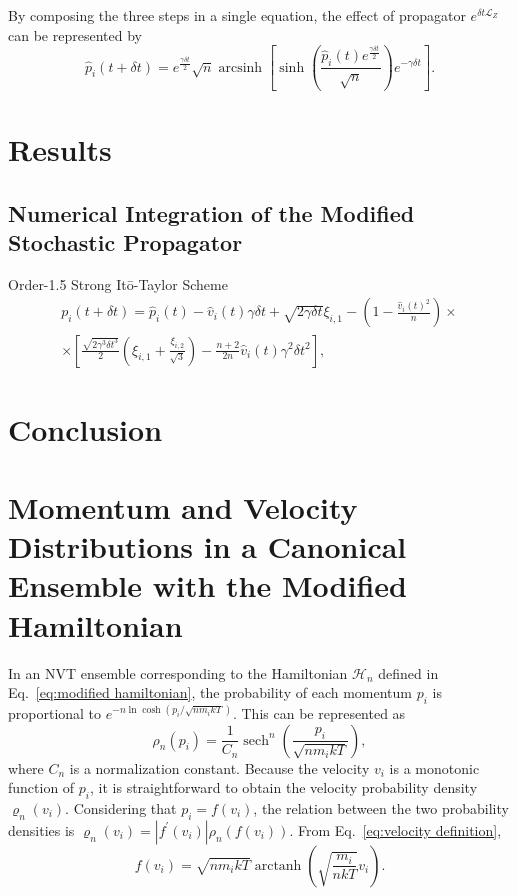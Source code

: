 \documentclass[
aip,
jcp,
reprint,
]{revtex4-1}
\DeclareMathOperator\arctanh{arctanh}
\DeclareMathOperator\arcsinh{arcsinh}
\DeclareMathOperator\sech{sech}
\begin{document}
By composing the three steps in a single equation, the effect of propagator $e^{\delta t \mathcal{L}_{Z}}$ can be represented by
\begin{equation*}
\hat{p}_i(t+\delta t) = e^{\frac{\gamma \delta t}{2}} \sqrt{n} \arcsinh\left[\sinh\left(\frac{\hat{p}_i(t) e^{\frac{\gamma \delta t}{2}}}{\sqrt{n}}\right) e^{-\gamma \delta t} \right].
\end{equation*}

\section{Results}

\subsection{Numerical Integration of the Modified Stochastic Propagator}

Order-1.5 Strong It\={o}-Taylor Scheme \cite{Kloeden_1992}
\begin{multline}
p_i(t+\delta t) = \hat{p}_i(t) - \hat{v}_i(t) \gamma \delta t + \sqrt{2 \gamma \delta t} \xi_{i,1} - \left(1 - \frac{\hat{v}_i(t)^2}{n}\right) \times \\
\times \left[ \frac{\sqrt{2 \gamma^3 \delta t^3}}{2}\left(\xi_{i,1} + \frac{\xi_{i,2}}{\sqrt{3}}\right) - \frac{n+2}{2 n} \hat{v}_i(t) \gamma^2 \delta t^2 \right],
\end{multline}




\section{Conclusion}

\appendix

\section{Momentum and Velocity Distributions in a Canonical Ensemble with the Modified Hamiltonian}
\label{sec:momentum and velocity distributions}

In an NVT ensemble corresponding to the Hamiltonian ${\mathcal H}_n$ defined in Eq.~\eqref{eq:modified hamiltonian}, the probability of each momentum $p_i$ is proportional to $e^{-n\ln\cosh(p_i/\sqrt{n m_i kT})}$.
This can be represented as
\begin{equation*}
\rho_n(p_i) = \frac{1}{C_n} \sech^n\left(\frac{p_i}{\sqrt{n m_i k T}}\right),
\end{equation*}
where $C_n$ is a normalization constant.
Because the velocity $v_i$ is a monotonic function of $p_i$, it is straightforward to obtain the velocity probability density $\varrho_n(v_i)$.
Considering that $p_i = f(v_i)$, the relation between the two probability densities is $\varrho_n(v_i) = |f^\prime(v_i)| \rho_n\left(f(v_i)\right)$.
From Eq.~\eqref{eq:velocity definition},
\begin{equation}
\label{eq:momentum as a function of velocity}
f(v_i) = \sqrt{n m_i k T}\arctanh\left(\sqrt{\frac{m_i}{n k T}} v_i\right).
\end{equation}
\end{document}

